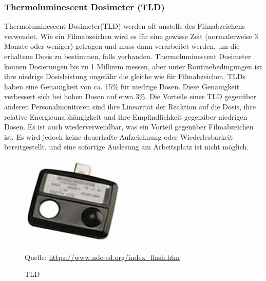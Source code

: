 {\subsubsection{Thermoluminescent Dosimeter (TLD)}
Thermoluminescent Dosimeter(TLD) werden oft anstelle des Filmabzeichens verwendet. Wie ein Filmabzeichen wird es für eine gewisse Zeit (normalerweise 3 Monate oder weniger) getragen und muss dann verarbeitet werden, um die erhaltene Dosis zu bestimmen, falls vorhanden. Thermoluminescent Dosimeter können Dosierungen bis zu 1 Millirem messen, aber unter Routinebedingungen ist ihre niedrige Dosisleistung ungefähr die gleiche wie für Filmabzeichen. TLDs haben eine Genauigkeit von ca. 15\% für niedrige Dosen. Diese Genauigkeit verbessert sich bei hohen Dosen auf etwa 3\%. Die Vorteile einer TLD gegenüber anderen Personalmonitoren sind ihre Linearität der Reaktion auf die Dosis, ihre relative Energieunabhängigkeit und ihre Empfindlichkeit gegenüber niedrigen Dosen. Es ist auch wiederverwendbar, was ein Vorteil gegenüber Filmabzeichen ist. Es wird jedoch keine dauerhafte Aufzeichnung oder Wiederlesbarkeit bereitgestellt, und eine sofortige Auslesung am Arbeitsplatz ist nicht möglich.
\begin{figure}[htb]
\centering
   \includegraphics[scale=0.9]{img/TLD.jpg}\\
  \caption{TLD}
  \label{fig:TLD}
  Quelle: \url{https://www.nde-ed.org/index_flash.htm}
\end{figure}
}
